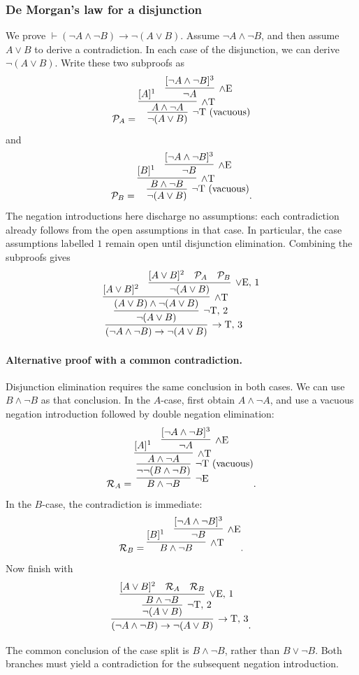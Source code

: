 \documentclass[11pt,a4paper]{amsart}
\begin{document}
\subsubsection{De Morgan's law for a disjunction}

\begin{example}
  We prove \(\vdash(\neg A\land\neg B)\to\neg(A\lor B)\).
  Assume \(\neg A\land\neg B\), and then assume \(A\lor B\) to
  derive a contradiction. In each case of the disjunction, we can derive
  \(\neg(A\lor B)\). Write these two subproofs as
  \[
    \mathcal P_A =
    \infer[\neg\mathrm T\text{ (vacuous)}]{\neg(A\lor B)}{
      \infer[\land\mathrm T]{A\land\neg A}{
    [A]^1 & \infer[\land\mathrm E]{\neg A}{[\neg A\land\neg B]^3}}}
  \]
  and
  \[
    \mathcal P_B =
    \infer[\neg\mathrm T\text{ (vacuous)}]{\neg(A\lor B)}{
      \infer[\land\mathrm T]{B\land\neg B}{
    [B]^1 & \infer[\land\mathrm E]{\neg B}{[\neg A\land\neg B]^3}}}.
  \]
  The negation introductions here discharge no assumptions: each
  contradiction already follows from the open assumptions in that case.
  In particular, the case assumptions labelled \(1\) remain open until
  disjunction elimination. Combining the subproofs gives
  \[
    \infer[\to\mathrm T,\,3]{(\neg A\land\neg B)\to\neg(A\lor B)}{
      \infer[\neg\mathrm T,\,2]{\neg(A\lor B)}{
        \infer[\land\mathrm T]{(A\lor B)\land\neg(A\lor B)}{
          [A\lor B]^2
          & \infer[\lor\mathrm E,\,1]{\neg(A\lor B)}{
    [A\lor B]^2 & \mathcal P_A & \mathcal P_B}}}}
  \]
\end{example}

\paragraph{Alternative proof with a common contradiction.}
Disjunction elimination requires the same conclusion in both cases.
We can use \(B\land\neg B\) as that conclusion. In the \(A\)-case,
first obtain \(A\land\neg A\), and use a vacuous negation introduction
followed by double negation elimination:
\[
  \mathcal R_A =
  \infer[\neg\mathrm E]{B\land\neg B}{
    \infer[\neg\mathrm T\text{ (vacuous)}]{\neg\neg(B\land\neg B)}{
      \infer[\land\mathrm T]{A\land\neg A}{
  [A]^1 & \infer[\land\mathrm E]{\neg A}{[\neg A\land\neg B]^3}}}}.
\]
In the \(B\)-case, the contradiction is immediate:
\[
  \mathcal R_B =
  \infer[\land\mathrm T]{B\land\neg B}{
  [B]^1 & \infer[\land\mathrm E]{\neg B}{[\neg A\land\neg B]^3}}.
\]
Now finish with
\[
  \infer[\to\mathrm T,\,3]{(\neg A\land\neg B)\to\neg(A\lor B)}{
    \infer[\neg\mathrm T,\,2]{\neg(A\lor B)}{
      \infer[\lor\mathrm E,\,1]{B\land\neg B}{
  [A\lor B]^2 & \mathcal R_A & \mathcal R_B}}}.
\]
\begin{remark}
  The common conclusion of the case split is \(B\land\neg B\),
  rather than \(B\lor\neg B\). Both branches must yield a contradiction
  for the subsequent negation introduction.
\end{remark}
\end{document}
